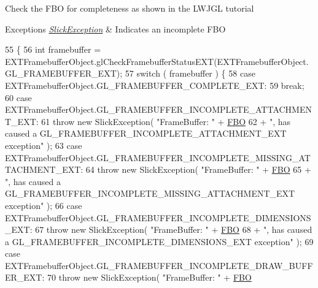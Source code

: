 Check the F\+BO for completeness as shown in the L\+W\+J\+GL tutorial


\begin{DoxyExceptions}{Exceptions}
{\em \mbox{\hyperlink{classorg_1_1newdawn_1_1slick_1_1_slick_exception}{Slick\+Exception}}} & Indicates an incomplete F\+BO \\
\hline
\end{DoxyExceptions}

\begin{DoxyCode}
55                                                        \{
56         \textcolor{keywordtype}{int} framebuffer = EXTFramebufferObject.glCheckFramebufferStatusEXT(EXTFramebufferObject.
      GL\_FRAMEBUFFER\_EXT); 
57         \textcolor{keywordflow}{switch} ( framebuffer ) \{
58             \textcolor{keywordflow}{case} EXTFramebufferObject.GL\_FRAMEBUFFER\_COMPLETE\_EXT:
59                 \textcolor{keywordflow}{break};
60             \textcolor{keywordflow}{case} EXTFramebufferObject.GL\_FRAMEBUFFER\_INCOMPLETE\_ATTACHMENT\_EXT:
61                 \textcolor{keywordflow}{throw} \textcolor{keyword}{new} SlickException( \textcolor{stringliteral}{"FrameBuffer: "} + \mbox{\hyperlink{classorg_1_1newdawn_1_1slick_1_1opengl_1_1pbuffer_1_1_f_b_o_graphics_a94baa0295ca9f8d804b98c49be9abc8a}{FBO}}
62                         + \textcolor{stringliteral}{", has caused a GL\_FRAMEBUFFER\_INCOMPLETE\_ATTACHMENT\_EXT exception"} );
63             \textcolor{keywordflow}{case} EXTFramebufferObject.GL\_FRAMEBUFFER\_INCOMPLETE\_MISSING\_ATTACHMENT\_EXT:
64                 \textcolor{keywordflow}{throw} \textcolor{keyword}{new} SlickException( \textcolor{stringliteral}{"FrameBuffer: "} + \mbox{\hyperlink{classorg_1_1newdawn_1_1slick_1_1opengl_1_1pbuffer_1_1_f_b_o_graphics_a94baa0295ca9f8d804b98c49be9abc8a}{FBO}}
65                         + \textcolor{stringliteral}{", has caused a GL\_FRAMEBUFFER\_INCOMPLETE\_MISSING\_ATTACHMENT\_EXT exception"} );
66             \textcolor{keywordflow}{case} EXTFramebufferObject.GL\_FRAMEBUFFER\_INCOMPLETE\_DIMENSIONS\_EXT:
67                 \textcolor{keywordflow}{throw} \textcolor{keyword}{new} SlickException( \textcolor{stringliteral}{"FrameBuffer: "} + \mbox{\hyperlink{classorg_1_1newdawn_1_1slick_1_1opengl_1_1pbuffer_1_1_f_b_o_graphics_a94baa0295ca9f8d804b98c49be9abc8a}{FBO}}
68                         + \textcolor{stringliteral}{", has caused a GL\_FRAMEBUFFER\_INCOMPLETE\_DIMENSIONS\_EXT exception"} );
69             \textcolor{keywordflow}{case} EXTFramebufferObject.GL\_FRAMEBUFFER\_INCOMPLETE\_DRAW\_BUFFER\_EXT:
70                 \textcolor{keywordflow}{throw} \textcolor{keyword}{new} SlickException( \textcolor{stringliteral}{"FrameBuffer: "} + \mbox{\hyperlink{classorg_1_1newdawn_1_1slick_1_1opengl_1_1pbuffer_1_1_f_b_o_graphics_a94baa0295ca9f8d804b98c49be9abc8a}{FBO}}

\end{DoxyCode}
